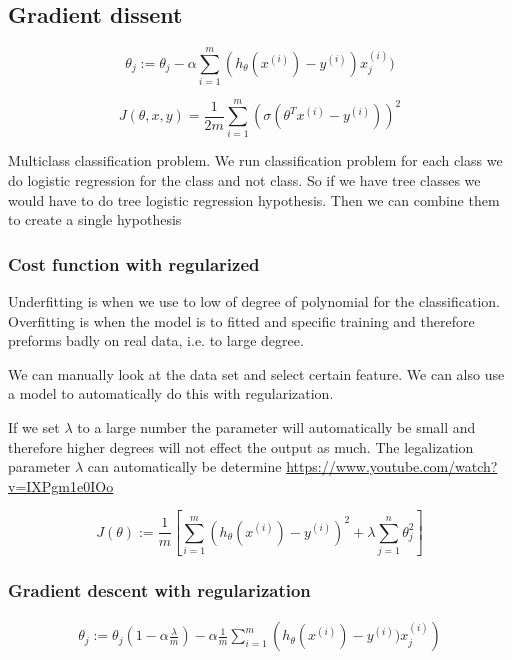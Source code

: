 \documentclass{article}
\begin{document}
\subsection{Gradient dissent}
\begin{equation*}
    \theta_j := \theta_j -\alpha\sum_{i=1}^m (h_{\theta}(x^{(i)}) - y^{(i)})x_j^{(i)})
\end{equation*}

\begin{equation*}
    J(\theta, x, y) = \frac{1}{2m}\sum_{i=1}^m\left( \sigma\left( \theta^Tx^{(i)} -y^{(i)} \right) \right)^2
\end{equation*}

Multiclass classification problem.
We run classification problem for each class we do logistic regression for 
the class and not class. So if we have tree classes we would have to do tree 
logistic regression hypothesis. Then we can combine them to create a single hypothesis


\subsubsection{Cost function with regularized}
Underfitting is when we use to low of degree of polynomial for the classification.
Overfitting is when the model is to fitted and specific training and therefore preforms badly 
on real data, i.e. to large degree.

We can manually look at the data set and select certain feature.
We can also use a model to automatically do this with regularization.

If we set $\lambda$ to a large number the parameter will automatically be small and 
therefore higher degrees will not effect the output as much.
The legalization parameter $\lambda$ can automatically be determine \newline
\url{https://www.youtube.com/watch?v=IXPgm1e0IOo}

\begin{equation*}
    J(\theta) := \frac{1}{m}\left[\sum_{i=1}^m (h_{\theta}(x^{(i)}) - y^{(i)})^2 + \lambda\sum_{j=1}^n \theta_j^2\right]
\end{equation*}

\subsubsection{Gradient descent with regularization}
\begin{align*}
    \theta_j := \theta_j\left(1-\alpha\frac{\lambda}{m}\right) - \alpha\frac{1}{m}\sum_{i=1}^m \left(h_{\theta}(x^{(i)}) - y^{(i)})x_j^{(i)}\right)
\end{align*}
\end{document}
